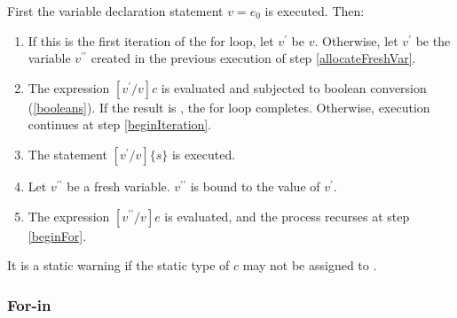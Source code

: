 \documentclass{article}
\newcommand{\code}[1]{{\sf #1}}
\begin{document}
\begin{itemize}
\LMHash{}
First the variable declaration statement \VAR{} $v = e_0$ is executed. Then:
\begin{enumerate}
\item
\label{beginFor}
If this is the first iteration of the for loop, let $v^\prime$ be $v$. Otherwise,  let $v^\prime$ be the variable $v^{\prime\prime}$ created in the previous execution of step \ref{allocateFreshVar}.
\item
The expression $[v^\prime/v]c$ is evaluated and subjected to boolean conversion (\ref{booleans}). If the result is \FALSE{}, the for loop completes. Otherwise, execution continues at step
\ref{beginIteration}.
\item
\label{beginIteration}
The statement $[v^\prime/v]\{s\}$ is executed.
\item
\label{allocateFreshVar}
Let $v^{\prime\prime}$ be a fresh variable.  $v^{\prime\prime}$ is bound to the value of $v^\prime$.
\item
The expression $[v^{\prime\prime}/v]e$ is evaluated, and the process recurses at step
  \ref{beginFor}.
\end{enumerate}


\LMHash{}
It is a static warning if the static type of $c$ may not be assigned to .




\subsubsection{For-in}


\end{itemize}
\end{document}
